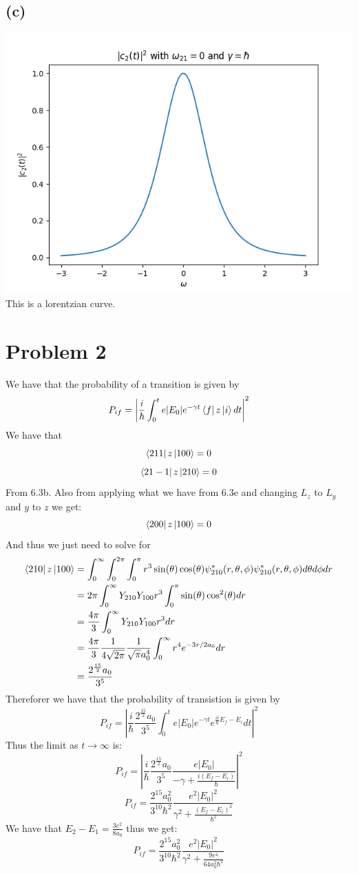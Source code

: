 \documentclass[11pt]{article}
\begin{document}
\subsection*{(c)}
\includegraphics*[width=0.7\columnwidth]{fig1.png}\\
This is a lorentzian curve.
\section*{Problem 2}
We have that the probability of a transition is given by
$$P_{if}=\left|\frac{i}{\hbar}\int_{0}^{t} e|E_0|e^{-\gamma t} \bra{f}z\ket{i}dt\right|^2$$
We have that
$$\bra{211}z\ket{100}=0$$
$$\bra{21-1}z\ket{210}=0$$
From 6.3b. Also from applying what we have from 6.3e and changing 
$L_z$ to $L_y$ and $y$ to $z$ we get:
$$\bra{200}z\ket{100}=0$$
And thus we just need to solve for 
\begin{align*}
    \bra{210}z\ket{100}&=\int_{0}^{\infty}\int_{0}^{2\pi}\int_{0}^{\pi} r^3\sin(\theta)\cos(\theta)
    \psi_{210}^{*}(r,\theta,\phi)\psi_{210}^{*}(r,\theta,\phi)d\theta d\phi dr\\
    &= 2\pi\int_{0}^{\infty}Y_{210} Y_{100} r^3\int_{0}^{\pi}\sin(\theta)\cos^2(\theta)dr\\
    &= \frac{4\pi}{3}\int_{0}^{\infty}Y_{210} Y_{100} r^3dr\\
    &= \frac{4\pi}{3}\frac{1}{4\sqrt{2\pi}}\frac{1}{\sqrt{\pi}a_0^{4}}\int_{0}^{\infty} r^4 e^{-3r/2a_0}dr\\
    &= \frac{2^\frac{15}{2}a_0}{3^5}
\end{align*}
Thereforer we have that the probability of transistion is given by 
$$P_{if}=\left|\frac{i}{\hbar}\frac{2^\frac{15}{2}a_0}{3^5} \int_{0}^{t} e|E_0|e^{-\gamma t}e^{\frac{it}{\hbar}E_f-E_i}dt\right|^2$$
Thus the limit as $t\rightarrow\infty$ is:
$$P_{if}=\left|\frac{i}{\hbar}\frac{2^\frac{15}{2}a_0}{3^5} \frac{e|E_0|}{-\gamma+\frac{i(E_f-E_i)}{\hbar}}\right|^2$$
$$P_{if}=\frac{2^{15}a_0^2}{3^{10}\hbar^2} \frac{e^2|E_0|^2}{\gamma^2+\frac{(E_f-E_i)^2}{\hbar^2}}$$
We have that $E_2-E_1 = \frac{3e^2}{8a_0}$ thus we get:
$$P_{if}=\boxed{\frac{2^{15}a_0^2}{3^{10}\hbar^2} \frac{e^2|E_0|^2}{\gamma^2+\frac{9e^4}{64a_0^2\hbar^2}}}$$
\end{document}

